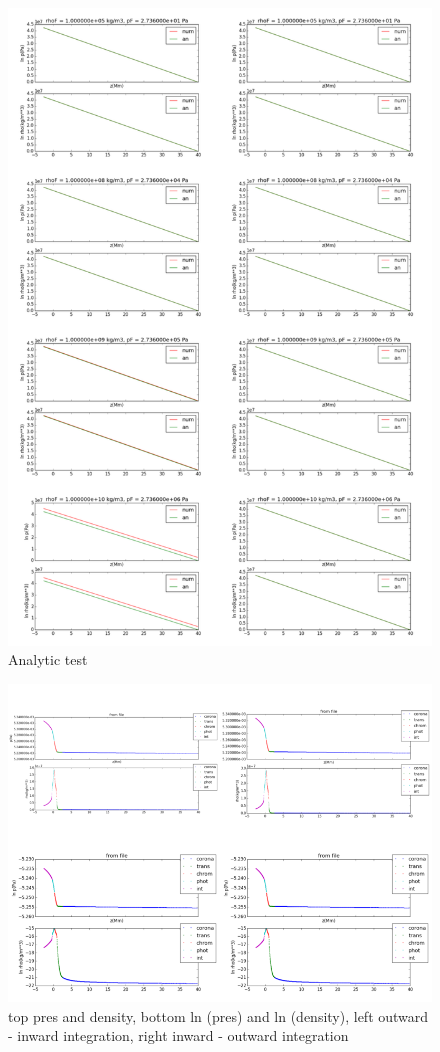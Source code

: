 \documentclass[10pt]{book}
\begin{document}
\begin{figure}[!ht]
 \centering
 \includegraphics[scale=0.5]{allanalytic2.png}
 \caption{Analytic test}
\end{figure}


\begin{figure}[!ht]
 \centering
 \includegraphics[scale=0.5]{allfile.png}
 \caption{top pres and density, bottom ln (pres) and ln (density), left outward - inward integration, right inward - outward integration}
\end{figure}
\end{document}
